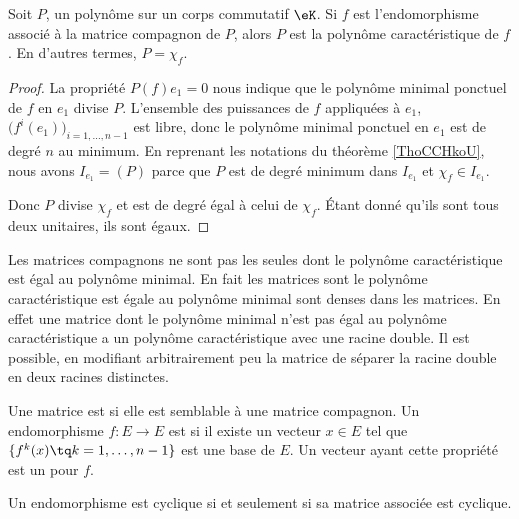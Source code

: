 \begin{lemma} \label{LemkVNisk}
    Soit \( P\), un polynôme sur un corps commutatif \( \eK\). Si \( f\) est l'endomorphisme associé à la matrice compagnon de \( P\), alors \( P\) est la polynôme caractéristique de \( f\). En d'autres termes, \( P=\chi_f\).
\end{lemma}

\begin{proof}
    La propriété \( P(f)e_1=0\) nous indique que le polynôme minimal ponctuel de \( f\) en \( e_1\) divise \( P\). L'ensemble des puissances de \( f\) appliquées à \( e_1\), \( \big( f^i(e_1) \big)_{i=1,\ldots, n-1}\) est libre, donc le polynôme minimal ponctuel en \( e_1\) est de degré \( n\) au minimum. En reprenant les notations du théorème \ref{ThoCCHkoU}, nous avons \( I_{e_1}=(P)\) parce que \( P\) est de degré minimum dans \( I_{e_1}\) et \( \chi_f\in I_{e_1}\).

    Donc \( P\) divise \( \chi_f\) et est de degré égal à celui de \( \chi_f\). Étant donné qu'ils sont tous deux unitaires, ils sont égaux.
\end{proof}

\begin{remark}  \label{RemmQjZOA}
    Les matrices compagnons ne sont pas les seules dont le polynôme caractéristique est égal au polynôme minimal. En fait les matrices sont le polynôme caractéristique est égale au polynôme minimal sont denses dans les matrices. En effet une matrice dont le polynôme minimal n'est pas égal au polynôme caractéristique a un polynôme caractéristique avec une racine double. Il est possible, en modifiant arbitrairement peu la matrice de séparer la racine double en deux racines distinctes.
\end{remark}

\begin{definition}
    Une matrice est  si elle est semblable à une matrice compagnon. Un endomorphisme \( f\colon E\to E\) est  si il existe un vecteur \( x\in E\) tel que \( \{ f^k(x)\tq k=1,\ldots, n-1 \}\) est une base de \( E\). Un vecteur ayant cette propriété est un  pour \( f\).
\end{definition}

\begin{lemma}
    Un endomorphisme est cyclique si et seulement si sa matrice associée est cyclique.
\end{lemma}

